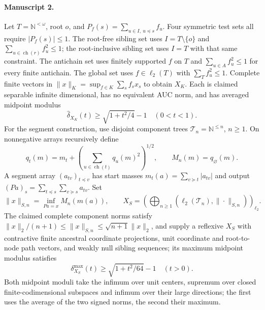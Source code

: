 \documentclass[11pt]{article}
\begin{document}
\paragraph{Manuscript 2.}
Let $T=\mathbb N^{<\omega}$, root $o$, and $P_f(s)=\sum_{u\in I,\ u\preceq s}f_u$. Four symmetric test sets all require $|P_f(s)|\le1$. The root-free sibling set uses $I=T\setminus\{o\}$ and $\sum_{u\in\operatorname{ch}(r)}f_u^2\le1$; the root-inclusive sibling set uses $I=T$ with that same constraint. The antichain set uses finitely supported $f$ on $T$ and $\sum_{u\in A}f_u^2\le1$ for every finite antichain. The global set uses $f\in\ell_2(T)$ with $\sum_Tf_u^2\le1$. Complete finite vectors in $\|x\|_K=\sup_{f\in K}\sum_s f_sx_s$ to obtain $X_K$. Each is claimed separable infinite dimensional, has no equivalent AUC norm, and has averaged midpoint modulus
\[
 \widehat\delta_{X_K}(t)\ge\sqrt{1+t^2/4}-1\quad(0<t<1).
\]
For the segment construction, use disjoint component trees $\mathcal T_n=\mathbb N^{\le n}$, $n\ge1$. On nonnegative arrays recursively define
\[
 q_t(m)=m_t+(\sum_{u\in\operatorname{ch}(t)}q_u(m)^2)^{1/2},\qquad M_n(m)=q_{\varnothing}(m).
\]
A segment array $(a_{tv})_{t\preceq v}$ has start masses $m_t(a)=\sum_{v\succeq t}|a_{tv}|$ and output $(Pa)_s=\sum_{t\preceq s}\sum_{v\succeq s}a_{tv}$. Set
\[
 \|x\|_{S,n}=\inf_{Pa=x}M_n(m(a)),\qquad
 X_S=\left(\bigoplus_{n\ge1}(\ell_2(\mathcal T_n),\|\cdot\|_{S,n})\right)_{\ell_2}.
\]
The claimed complete component norms satisfy $\|x\|_2/(n+1)\le\|x\|_{S,n}\le\sqrt{n+1}\|x\|_2$, and supply a reflexive $X_S$ with contractive finite ancestral coordinate projections, unit coordinate and root-to-node path vectors, and weakly null sibling sequences; its maximum midpoint modulus satisfies
\[
 \delta^{\max}_{X_S}(t)\ge\sqrt{1+t^2/64}-1\quad(t>0).
\]
Both midpoint moduli take the infimum over unit centers, supremum over closed finite-codimensional subspaces and infimum over their large directions; the first uses the average of the two signed norms, the second their maximum.
\end{document}
